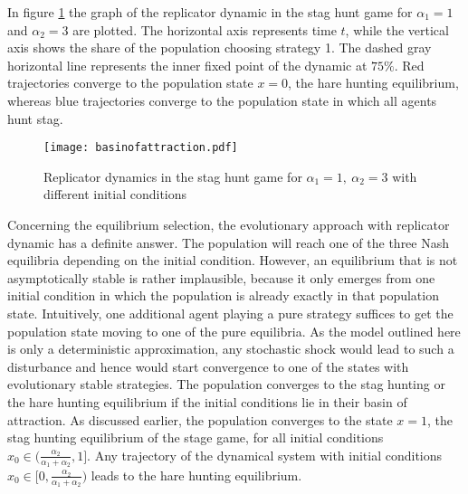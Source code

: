 In figure \ref{fig:basinofattraction} the graph of the replicator dynamic
in the stag hunt game for $\alpha_1=1$ and $\alpha_2=3$ are plotted. The
horizontal axis represents time $t$, while the vertical axis shows
the share of the population choosing strategy 1. The dashed gray horizontal
line represents the inner fixed point of the dynamic at $75\%$.
Red trajectories converge to the population state $x=0$, the hare hunting
equilibrium, whereas blue trajectories converge to the population state in 
which all agents hunt stag.
\begin{figure}
 \centering
        \texttt{[image: basinofattraction.pdf]}
        \caption[Replicator dynamic of the stag hunt game]{Replicator dynamics in the stag hunt game for 
                $\alpha_1=1,\ \alpha_2=3$ with different initial conditions}
                \label{fig:basinofattraction}
\end{figure}

Concerning the equilibrium selection, the evolutionary approach with replicator
dynamic has a definite answer. The population will reach one of the three
Nash equilibria depending on the initial condition. 
However, an equilibrium that is not asymptotically stable 
is rather implausible,
because it only emerges from one initial condition in which the population
is already exactly in that population state. 
Intuitively, one additional agent playing
a pure strategy suffices to get the population state moving to one of the
pure equilibria. As the model outlined here is only a deterministic
approximation, any stochastic shock would lead to such a disturbance and hence
would start convergence to one of the states with evolutionary stable 
strategies.
The population converges to the stag hunting or the hare
hunting equilibrium if the initial conditions lie in their 
basin of attraction.
As discussed earlier, the population converges to the state $x=1$, 
the stag hunting equilibrium of the stage game, for all initial conditions 
$x_0 \in (\frac{\alpha_2}{\alpha_1+\alpha_2},1]$. Any trajectory of the 
dynamical system with initial conditions 
$x_0 \in [0,\frac{\alpha_2}{\alpha_1+\alpha_2})$ leads to the hare hunting
equilibrium. 

